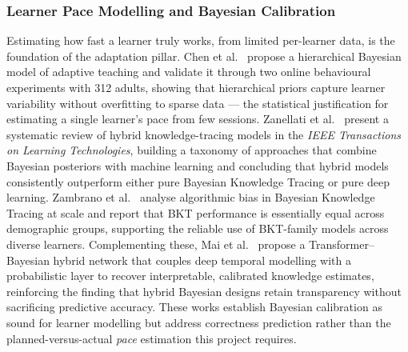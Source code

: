 \documentclass[12pt]{report}
\begin{document}
\subsubsection{Learner Pace Modelling and Bayesian Calibration}
Estimating how fast a learner truly works, from limited per-learner data, is the
foundation of the adaptation pillar. Chen et al.~\cite{chen2024} propose a hierarchical
Bayesian model of adaptive teaching and validate it through two online behavioural
experiments with 312 adults, showing that hierarchical priors capture learner variability
without overfitting to sparse data --- the statistical justification for estimating a
single learner's pace from few sessions. Zanellati et al.~\cite{zanellati2024} present a
systematic review of hybrid knowledge-tracing models in the \textit{IEEE Transactions on
Learning Technologies}, building a taxonomy of approaches that combine Bayesian posteriors
with machine learning and concluding that hybrid models consistently outperform either
pure Bayesian Knowledge Tracing or pure deep learning. Zambrano et al.~\cite{zambrano2024}
analyse algorithmic bias in Bayesian Knowledge Tracing at scale and report that BKT
performance is essentially equal across demographic groups, supporting the reliable use of
BKT-family models across diverse learners. Complementing these, Mai et
al.~\cite{mai2025} propose a Transformer--Bayesian hybrid network that couples deep
temporal modelling with a probabilistic layer to recover interpretable, calibrated
knowledge estimates, reinforcing the finding that hybrid Bayesian designs retain
transparency without sacrificing predictive accuracy. These works establish Bayesian
calibration as sound for learner modelling but address correctness prediction rather than
the planned-versus-actual \emph{pace} estimation this project requires.
\end{document}
